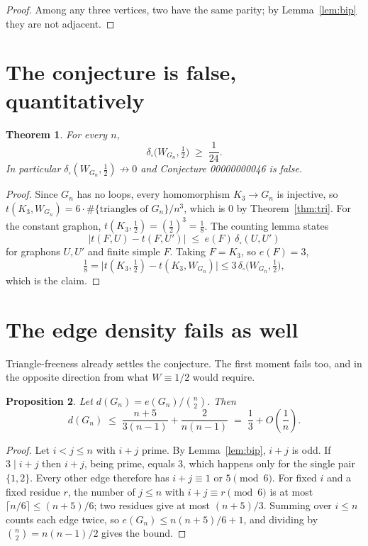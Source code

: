 \documentclass[11pt]{article}
\theoremstyle{plain}
\newtheorem{theorem}{Theorem}
\newtheorem{proposition}[theorem]{Proposition}
\theoremstyle{remark}
\newcommand{\dcut}{\delta_{\square}}
\begin{document}
\begin{proof}
Among any three vertices, two have the same parity; by Lemma~\ref{lem:bip}
they are not adjacent.
\end{proof}

\section{The conjecture is false, quantitatively}

\begin{theorem}\label{thm:main}
For every $n$,
\[
  \dcut\bigl(W_{G_n},\tfrac12\bigr)\;\ge\;\frac1{24} .
\]
In particular $\dcut(W_{G_n},\tfrac12)\not\to0$ and Conjecture 00000000046 is
false.
\end{theorem}

\begin{proof}
Since $G_n$ has no loops, every homomorphism $K_3\to G_n$ is injective, so
$t(K_3,W_{G_n})=6\cdot\#\{\text{triangles of }G_n\}/n^3$, which is $0$ by
Theorem~\ref{thm:tri}. For the constant graphon,
$t(K_3,\tfrac12)=(\tfrac12)^3=\tfrac18$. The counting lemma states
\[
  \bigl|t(F,U)-t(F,U')\bigr|\;\le\;e(F)\,\dcut(U,U')
\]
for graphons $U,U'$ and finite simple $F$. Taking $F=K_3$, so $e(F)=3$,
\[
  \tfrac18=\bigl|t(K_3,\tfrac12)-t(K_3,W_{G_n})\bigr|\le3\,\dcut\bigl(W_{G_n},\tfrac12\bigr),
\]
which is the claim.
\end{proof}

\section{The edge density fails as well}

Triangle-freeness already settles the conjecture. The first moment fails too,
and in the opposite direction from what $W\equiv1/2$ would require.

\begin{proposition}\label{prop:dens}
Let $d(G_n)=e(G_n)\big/\binom n2$. Then
\[
  d(G_n)\;\le\;\frac{n+5}{3(n-1)}+\frac{2}{n(n-1)}\;=\;\frac13+O\!\left(\frac1n\right).
\]
\end{proposition}

\begin{proof}
Let $i<j\le n$ with $i+j$ prime. By Lemma~\ref{lem:bip}, $i+j$ is odd. If
$3\mid i+j$ then $i+j$, being prime, equals $3$, which happens only for the
single pair $\{1,2\}$. Every other edge therefore has
$i+j\equiv1$ or $5\pmod6$. For fixed $i$ and a fixed residue $r$, the number of
$j\le n$ with $i+j\equiv r\pmod 6$ is at most $\lceil n/6\rceil\le(n+5)/6$; two
residues give at most $(n+5)/3$. Summing over $i\le n$ counts each edge twice,
so $e(G_n)\le n(n+5)/6+1$, and dividing by $\binom n2=n(n-1)/2$ gives the
bound.
\end{proof}
\end{document}
